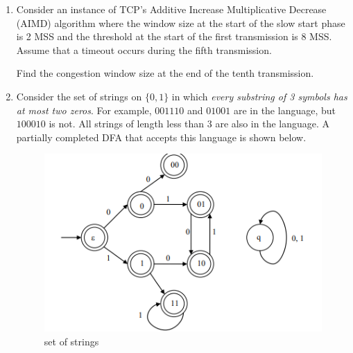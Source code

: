 \documentclass[journal]{IEEEtran}
\numberwithin{equation}{enumi}
\numberwithin{figure}{enumi}
\begin{document}
\begin{enumerate}
\begin{enumerate}
\end{enumerate}

\item Consider an instance of TCP's Additive Increase Multiplicative Decrease (AIMD) algorithm where the window size at the start of the slow start phase is 2 MSS and the threshold at the start of the first transmission is 8 MSS. Assume that a timeout occurs during the fifth transmission.  

Find the congestion window size at the end of the tenth transmission.

\begin{enumerate}
\end{enumerate}

\item Consider the set of strings on $\{0,1\}$ in which \emph{every substring of 3 symbols has at most two zeros}.  
For example, $001110$ and $01001$ are in the language, but $100010$ is not.  
All strings of length less than 3 are also in the language.  
A partially completed DFA that accepts this language is shown below.
\begin{figure}[H]
    \centering
    \includegraphics[width=0.5\columnwidth]{figs/New folder (2)/fig13.png}
    \caption{set of strings}
    \label{fig:13}
   \end{figure}


\end{enumerate}
\end{document}
